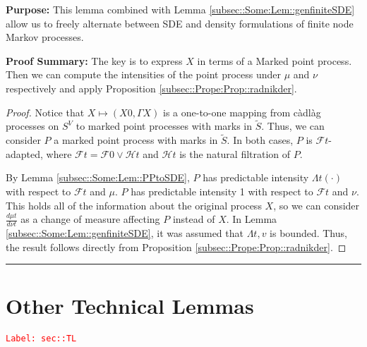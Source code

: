 \documentclass[12pt]{article}
\newcommand{\mc}{\mathcal}
\newcommand{\tr}{\textcolor{red}}
\newcommand{\labe}[1]{\tr{\texttt{Label: #1}}}
\newcommand{\purpose}{\textbf{Purpose: }}
\newcommand{\pfsum}{\textbf{Proof Summary: }}
\newcommand{\ind}{\hspace{24pt}}
\newcommand{\lin}{\rule{\linewidth}{0.4 pt}}
\renewcommand{\v}{v}							%
\renewcommand{\S}{S}							%
\renewcommand{\t}{t}							%
\newcommand{\F}{\mc{F}}							%
\newcommand{\FH}{\mc{H}}						%
\newcommand{\X}{X}								%
\newcommand{\carp}[1]{^{#1}}					%
\newcommand{\alt}[1]{\widetilde{#1}}			%
\newcommand{\m}{\mu}							%
\newcommand{\mm}{\nu}							%
\newcommand{\pmap}{\Gamma}						%
\newcommand{\rp}{P}								%
\newcommand{\ratee}{\Lambda}					%
\begin{document}
\purpose This lemma combined with Lemma \ref{subsec::Some:Lem::genfiniteSDE} allow us to freely alternate between SDE and density formulations of finite node Markov processes.

\pfsum The key is to express \(X\) in terms of a Marked point process. Then we can compute the intensities of the point process under \(\m\) and \(\mm\) respectively and apply Proposition \ref{subsec::Prope:Prop::radnikder}.

\begin{proof}
Notice that \(\X{}{} \mapsto (\X{}{0},\pmap{\X{}{}})\) is a one-to-one mapping from c\`adl\`ag processes on \(\S\carp{V}\) to marked point processes with marks in \(\alt{\S}\). Thus, we can consider \(\rp{}\) a marked point process with marks in \(\alt{\S}\). In both cases, \(\rp{}\) is \(\F{}{\t}\)-adapted, where \(\F{}{\t} = \F{}{0}\vee \FH{}{\t}\) and \(\FH{}{\t}\) is the natural filtration of \(\rp{}\).

\ind By Lemma \ref{subsec::Some:Lem::PPtoSDE}, \(\rp{}\) has predictable intensity \(\ratee{\t}(\cdot)\) with respect to \(\F{}{\t}\) and \(\m{}{}{}\). \(\rp{}\) has predictable intensity 1 with respect to \(\F{}{\t}\) and \(\mm{}{}{}\). This holds all of the information about the original process \(\X{}{}\), so we can consider \(\frac{d\m{}{\t}{}}{d\mm{}{\t}{}}\) as a change of measure affecting \(\rp{}\) instead of \(\X{}{}\). In Lemma \ref{subsec::Some:Lem::genfiniteSDE}, it was assumed that \(\ratee{\t,\v}\) is bounded. Thus, the result follows directly from Proposition \ref{subsec::Prope:Prop::radnikder}. 
\end{proof}

\lin
\section{Other Technical Lemmas}
\label{sec::TL}\labe{sec::TL}
\end{document}
